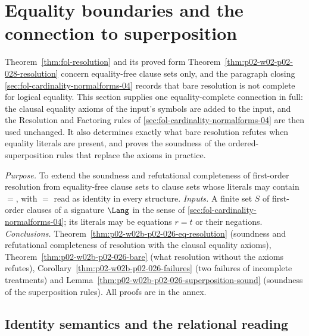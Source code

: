 \section{Equality boundaries and the connection to superposition}
\label{sec:p02-w02b-p02-026-equality}

Theorem~\ref{thm:fol-resolution} and its proved form
Theorem~\ref{thm:p02-w02-p02-028-resolution} concern equality-free clause
sets only, and the paragraph closing \cref{sec:fol-cardinality-normalforms-04}
records that bare resolution is not complete for logical equality.  This
section supplies one equality-complete connection in full: the clausal
equality axioms of the input's symbols are added to the input, and the
Resolution and Factoring rules of \cref{sec:fol-cardinality-normalforms-04}
are then used unchanged.  It also determines exactly what bare resolution
refutes when equality literals are present, and proves the soundness of the
ordered-superposition rules that replace the axioms in practice.

\emph{Purpose.}  To extend the soundness and refutational completeness of
first-order resolution from equality-free clause sets to clause sets whose
literals may contain \(=\), with \(=\) read as identity in every structure.
\emph{Inputs.}  A finite set \(S\) of first-order clauses of a signature
\(\Lang\) in the sense of \cref{sec:fol-cardinality-normalforms-04}; its
literals may be equations \(r=t\) or their negations.
\emph{Conclusions.}  Theorem~\ref{thm:p02-w02b-p02-026-eq-resolution}
(soundness and refutational completeness of resolution with the clausal
equality axioms), Theorem~\ref{thm:p02-w02b-p02-026-bare} (what resolution
without the axioms refutes), Corollary~\ref{thm:p02-w02b-p02-026-failures}
(two failures of incomplete treatments) and
Lemma~\ref{thm:p02-w02b-p02-026-superposition-sound} (soundness of the
superposition rules).  All proofs are in the annex.

\subsection{Identity semantics and the relational reading}
\label{sec:p02-w02b-p02-026-readings}

